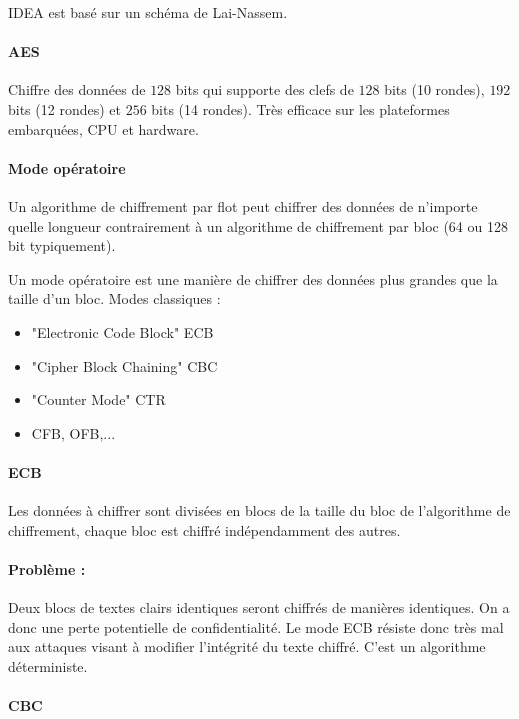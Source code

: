 \documentclass[11pt,a4paper]{report}
\begin{document}
IDEA est basé sur un schéma de Lai-Nassem.

\paragraph*{AES}

Chiffre des données de $128$ bits qui supporte des clefs de $128$ bits (10 rondes), $192$ bits (12 rondes) et $256$ bits (14 rondes). Très efficace sur les plateformes embarquées, CPU et hardware.

\paragraph*{Mode opératoire}

Un algorithme de chiffrement par flot peut chiffrer des données de n'importe quelle longueur contrairement à un algorithme de chiffrement par bloc (64 ou 128 bit typiquement).

Un mode opératoire est une manière de chiffrer des données plus grandes que la taille d'un bloc. Modes classiques :
\begin{itemize}
    \item "Electronic Code Block" ECB
    \item "Cipher Block Chaining" CBC
    \item "Counter Mode" CTR
    \item CFB, OFB,...
\end{itemize}

\paragraph*{ECB}

Les données à chiffrer sont divisées en blocs de la taille du bloc de l'algorithme de chiffrement, chaque bloc est chiffré indépendamment des autres.

\paragraph*{Problème : } Deux blocs de textes clairs identiques seront chiffrés de manières identiques. On a donc une perte potentielle de confidentialité. Le mode ECB résiste donc très mal aux attaques visant à modifier l'intégrité du texte chiffré. C'est un algorithme déterministe.

\paragraph*{CBC}
\end{document}
